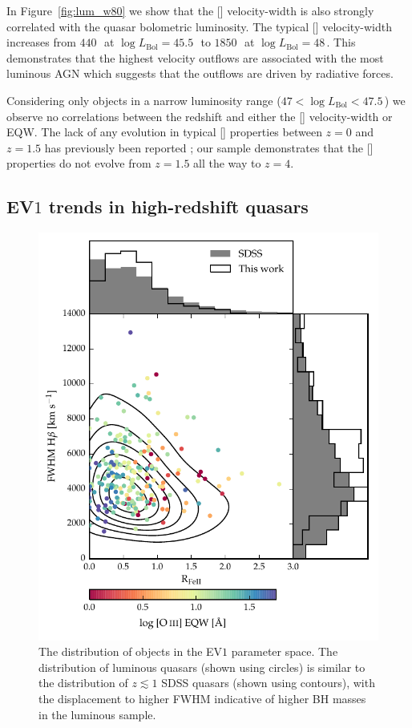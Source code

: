 In Figure~\ref{fig:lum_w80} we show that the [] velocity-width is also strongly correlated with the quasar bolometric luminosity.
The typical [] velocity-width increases from $440$\,\kms\, at $\log L_{\text{Bol}}=45.5$\,\ergs\, to $1850$\,\kms\, at $\log L_{\text{Bol}}=48$\,\ergs.  
This demonstrates that the highest velocity outflows are associated with the most luminous AGN which suggests that the outflows are driven by radiative forces. 

Considering only objects in a narrow luminosity range ($47 < \log L_{\text{Bol}} < 47.5$\,\ergs) we observe no correlations between the redshift and either the [] velocity-width or EQW.   
The lack of any evolution in typical [] properties between $z=0$ and $z=1.5$ has previously been reported \citep[e.g.][]{harrison16}; our sample demonstrates that the [] properties do not evolve from $z=1.5$ all the way to $z=4$. 

\subsection{EV$1$ trends in high-redshift quasars}

\begin{figure}[t!]
\centering 
    \includegraphics[width=\columnwidth]{figures/chapter04/ev1_lowz.pdf} 
    \caption[{The distribution of objects in the EV$1$ parameter space.}]{The distribution of objects in the EV$1$ parameter space. The distribution of luminous quasars (shown using circles) is similar to the distribution of $z \lesssim 1$ SDSS quasars (shown using contours), with the displacement to higher \hb FWHM indicative of higher BH masses in the luminous sample.}      
    \label{fig:ev1_lowz}
\end{figure}

